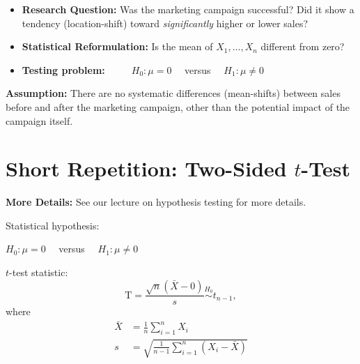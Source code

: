 \documentclass[
  letterpaper,
  DIV=11,
  numbers=noendperiod]{scrreprt}
\begin{document}
\begin{itemize}
\item
  \textbf{Research Question:} Was the marketing campaign successful? Did
  it show a tendency (location-shift) toward \emph{significantly} higher
  or lower sales?
\item
  \textbf{Statistical Reformulation:} Is the mean of \(X_1,\dots,X_n\)
  different from zero?
\item
  \textbf{Testing problem:} \(\hspace{1cm}H_0\colon \mu = 0\quad\)
  versus \(\quad H_1\colon \mu \neq 0\)
\end{itemize}

\begin{tcolorbox}[enhanced jigsaw, opacityback=0, colback=white, colframe=quarto-callout-note-color-frame, breakable, rightrule=.15mm, arc=.35mm, left=2mm, bottomrule=.15mm, toprule=.15mm, leftrule=.75mm]

\textbf{Assumption:} There are no systematic differences (mean-shifts)
between sales before and after the marketing campaign, other than the
potential impact of the campaign itself.

\end{tcolorbox}

\section{\texorpdfstring{Short Repetition: Two-Sided
\(t\)-Test}{Short Repetition: Two-Sided t-Test}}\label{short-repetition-two-sided-t-test}

\begin{tcolorbox}[enhanced jigsaw, opacityback=0, colback=white, colframe=quarto-callout-note-color-frame, breakable, rightrule=.15mm, arc=.35mm, left=2mm, bottomrule=.15mm, toprule=.15mm, leftrule=.75mm]

\textbf{More Details:} See our lecture on hypothesis testing for more
details.

\end{tcolorbox}

Statistical hypothesis:

\(\displaystyle H_0\colon \mu = 0\quad\) versus
\(\displaystyle \quad H_1\colon \mu \neq 0\)

\(t\)-test statistic: \[
\mathrm{T} = \frac{\sqrt{n}(\bar{X} - 0)}{s}\overset{H_0}{\sim} t_{n-1},
\] where \begin{align*}
\bar{X}&=\frac{1}{n}\sum_{i=1}^n X_i\\
s      &= \sqrt{\frac{1}{n-1}\sum_{i=1}^n(X_i-\bar{X})}
\end{align*}
\end{document}
